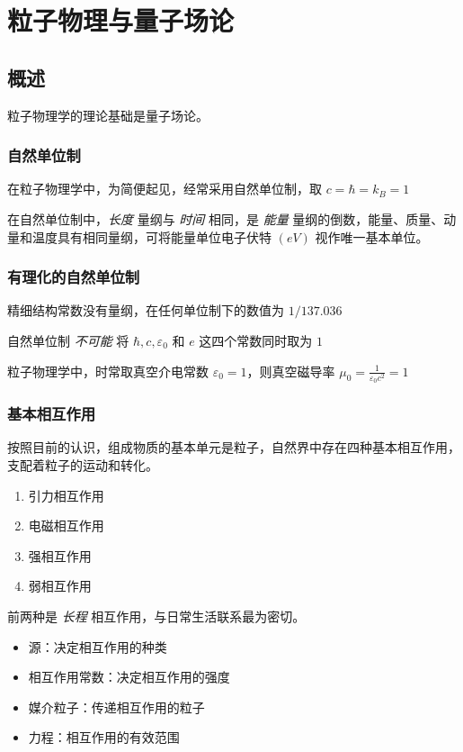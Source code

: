\chapter{粒子物理与量子场论}

\section{概述}

粒子物理学的理论基础是量子场论。

\subsection{自然单位制}

在粒子物理学中，为简便起见，经常采用自然单位制，取 $c=\hbar=k_B=1$

在自然单位制中，\emph{长度} 量纲与 \emph{时间} 相同，是 \emph{能量} 量纲的倒数，能量、质量、动量和温度具有相同量纲，可将能量单位电子伏特 $(\unit{eV})$ 视作唯一基本单位。

\subsection{有理化的自然单位制}

精细结构常数没有量纲，在任何单位制下的数值为 $1/137.036$

自然单位制 \emph{不可能} 将 $\hbar, c, \varepsilon_0$ 和 $e$ 这四个常数同时取为 $1$

粒子物理学中，时常取真空介电常数 $\varepsilon_0=1$，则真空磁导率 $\mu_0=\frac{1}{\varepsilon_0 c^2}=1$

\subsection{基本相互作用}

按照目前的认识，组成物质的基本单元是粒子，自然界中存在四种基本相互作用，支配着粒子的运动和转化。

\begin{enumerate}
    \item 引力相互作用
    \item 电磁相互作用
    \item 强相互作用
    \item 弱相互作用
\end{enumerate}

前两种是 \emph{长程} 相互作用，与日常生活联系最为密切。

\begin{itemize}
    \item 源：决定相互作用的种类
    \item 相互作用常数：决定相互作用的强度
    \item 媒介粒子：传递相互作用的粒子
    \item 力程：相互作用的有效范围
\end{itemize}

